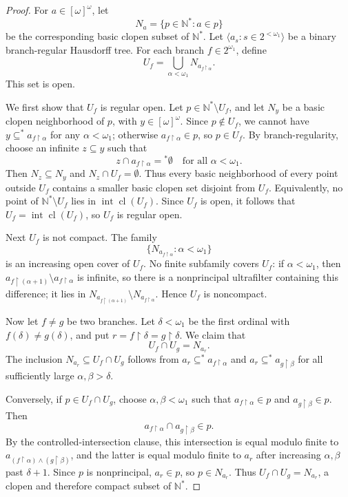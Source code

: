 \documentclass[11pt]{article}
\newcommand{\restr}{\upharpoonright}
\newcommand{\cl}{\operatorname{cl}}
\newcommand{\inter}{\operatorname{int}}
\begin{document}
\begin{proof}
For \(a\in[\omega]^\omega\), let
\[
  N_a=\{p\in\mathbb N^*:a\in p\}
\]
be the corresponding basic clopen subset of \(\mathbb N^*\). Let
\(\langle a_s:s\in2^{<\omega_1}\rangle\) be a binary branch-regular Hausdorff
tree. For each branch \(f\in2^{\omega_1}\), define
\[
  U_f=\bigcup_{\alpha<\omega_1}N_{a_{f\restr\alpha}}.
\]
This set is open.

We first show that \(U_f\) is regular open. Let \(p\in\mathbb N^*\setminus
U_f\), and let \(N_y\) be a basic clopen neighborhood of \(p\), with
\(y\in[\omega]^\omega\). Since \(p\notin U_f\), we cannot have
\(y\subseteq^*a_{f\restr\alpha}\) for any \(\alpha<\omega_1\); otherwise
\(a_{f\restr\alpha}\in p\), so \(p\in U_f\). By branch-regularity, choose an
infinite \(z\subseteq y\) such that
\[
  z\cap a_{f\restr\alpha}={}^*\emptyset
  \quad\text{for all }\alpha<\omega_1.
\]
Then \(N_z\subseteq N_y\) and \(N_z\cap U_f=\emptyset\). Thus every basic
neighborhood of every point outside \(U_f\) contains a smaller basic clopen
set disjoint from \(U_f\). Equivalently, no point of
\(\mathbb N^*\setminus U_f\) lies in \(\inter\cl(U_f)\). Since \(U_f\) is
open, it follows that \(U_f=\inter\cl(U_f)\), so \(U_f\) is regular open.

Next \(U_f\) is not compact. The family
\[
  \{N_{a_{f\restr\alpha}}:\alpha<\omega_1\}
\]
is an increasing open cover of \(U_f\). No finite subfamily covers \(U_f\):
if \(\alpha<\omega_1\), then
\(a_{f\restr(\alpha+1)}\setminus a_{f\restr\alpha}\) is infinite, so there is
a nonprincipal ultrafilter containing this difference; it lies in
\(N_{a_{f\restr(\alpha+1)}}\setminus N_{a_{f\restr\alpha}}\). Hence \(U_f\)
is noncompact.

Now let \(f\neq g\) be two branches. Let \(\delta<\omega_1\) be the first
ordinal with \(f(\delta)\neq g(\delta)\), and put \(r=f\restr\delta
=g\restr\delta\). We claim that
\[
  U_f\cap U_g=N_{a_r}.
\]
The inclusion \(N_{a_r}\subseteq U_f\cap U_g\) follows from
\(a_r\subseteq^*a_{f\restr\alpha}\) and
\(a_r\subseteq^*a_{g\restr\beta}\) for all sufficiently large
\(\alpha,\beta>\delta\).

Conversely, if \(p\in U_f\cap U_g\), choose \(\alpha,\beta<\omega_1\) such
that \(a_{f\restr\alpha}\in p\) and \(a_{g\restr\beta}\in p\). Then
\[
  a_{f\restr\alpha}\cap a_{g\restr\beta}\in p.
\]
By the controlled-intersection clause, this intersection is equal modulo
finite to \(a_{(f\restr\alpha)\wedge(g\restr\beta)}\), and the latter is
equal modulo finite to \(a_r\) after increasing \(\alpha,\beta\) past
\(\delta+1\). Since \(p\) is nonprincipal, \(a_r\in p\), so \(p\in N_{a_r}\).
Thus \(U_f\cap U_g=N_{a_r}\), a clopen and therefore compact subset of
\(\mathbb N^*\).


\end{proof}
\end{document}
